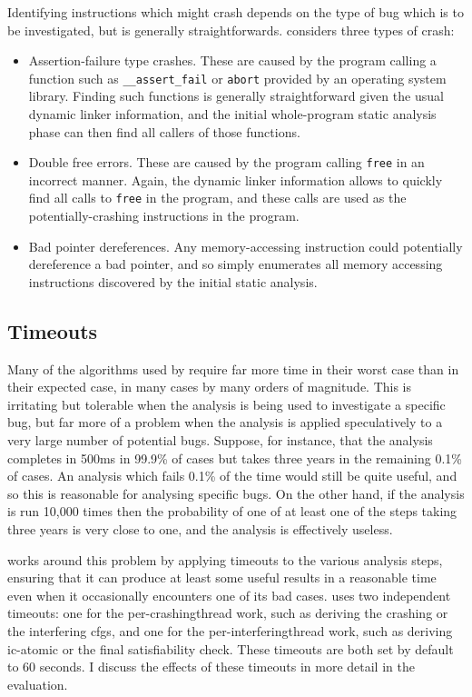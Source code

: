 Identifying instructions which might crash depends on the type of bug
which is to be investigated, but is generally straightforwards.
{\Implementation} considers three types of crash:

\begin{itemize}
\item Assertion-failure type crashes.  These are caused by the program
  calling a function such as \verb|__assert_fail| or \verb|abort|
  provided by an operating system library.  Finding such functions is
  generally straightforward given the usual dynamic linker
  information, and the initial whole-program static analysis phase can
  then find all callers of those functions.
\item Double free errors.  These are caused by the program calling
  \verb|free| in an incorrect manner.  Again, the dynamic linker
  information allows {\implementation} to quickly find all calls to
  \verb|free| in the program, and these calls are used as the
  potentially-crashing instructions in the program.
\item Bad pointer dereferences.  Any memory-accessing instruction
  could potentially dereference a bad pointer, and so
  {\implementation} simply enumerates all memory accessing
  instructions discovered by the initial static analysis.
\end{itemize}

\subsection{Timeouts}

Many of the algorithms used by {\technique} require far more time in
their worst case than in their expected case, in many cases by many
orders of magnitude.  This is irritating but tolerable when the
analysis is being used to investigate a specific bug, but far more of
a problem when the analysis is applied speculatively to a very large
number of potential bugs.  Suppose, for instance, that the analysis
completes in 500ms in 99.9\% of cases but takes three years in the
remaining 0.1\% of cases.  An analysis which fails 0.1\% of the time
would still be quite useful, and so this is reasonable for analysing
specific bugs.  On the other hand, if the analysis is run 10,000 times
then the probability of one of at least one of the steps taking three
years is very close to one, and the analysis is effectively useless.

{\Technique} works around this problem by applying timeouts to the
various analysis steps, ensuring that it can produce at least some
useful results in a reasonable time even when it occasionally
encounters one of its bad cases.  {\Implementation} uses two
independent timeouts: one for the per-\gls{crashingthread} work, such
as deriving the crashing {\StateMachine} or the interfering
\glspl{cfg}, and one for the per-\gls{interferingthread} work, such as
deriving \gls{ic-atomic} or the final satisfiability check.  These
timeouts are both set by default to 60 seconds.  I discuss the effects
of these timeouts in more detail in the evaluation.

